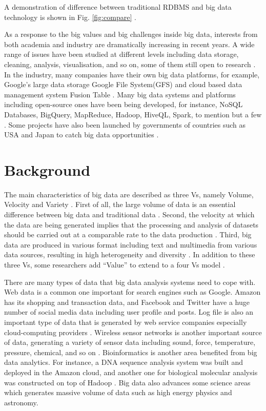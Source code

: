 \documentclass[conference]{IEEEtran}
\begin{document}
A demonstration of difference between traditional RDBMS and big data
technology is shown in Fig. \ref{fig:compare} .

As a response to the big values and big challenges inside big data,
interests from both academia and industry are dramatically increasing in
recent years. A wide range of issues have been studied at different
levels including data storage, cleaning, analysis, visualisation, and so
on, some of them still open to research \autocite{OUSSOUS2018431}. In
the industry, many companies have their own big data platforms, for
example, Google's large data storage Google File System(GFS) and cloud
based data management system Fusion Table \autocite{Hewage2018}. Many
big data systems and platforms including open-source ones have been
being developed, for instance, NoSQL Databases, BigQuery, MapReduce,
Hadoop, HiveQL, Spark, to mention but a few
\autocite{Hewage2018,SIVARAJAH2017,hu2014}. Some projects have also been
launched by governments of countries such as USA and Japan to catch big
data opportunities \autocite{OUSSOUS2018431}.

\hypertarget{background}{%
\section{Background}\label{background}}

The main characteristics of big data are described as three Vs, namely
Volume, Velocity and Variety \autocite{OUSSOUS2018431,hu2014}. First of
all, the large volume of data is an essential difference between big
data and traditional data \autocite{hu2014}. Second, the velocity at
which the data are being generated implies that the processing and
analysis of datasets should be carried out at a comparable rate to the
data production \autocite{hu2014}. Third, big data are produced in
various format including text and multimedia from various data sources,
resulting in high heterogeneity and diversity
\autocite{OUSSOUS2018431,Pouyanfar2018}. In addition to these three Vs,
some researchers add ``Value'' to extend to a four Vs model
\autocite{hashem_rise_2015}.

There are many types of data that big data analysis systems need to cope
with. Web data is a common one important for search engines such as
Google. Amazon has its shopping and transaction data, and Facebook and
Twitter have a huge number of social media data including user profile
and posts. Log file is also an important type of data that is generated
by web service companies especially cloud-computing providers
\autocite{hu2014}. Wireless sensor networks is another important source
of data, generating a variety of sensor data including sound, force,
temperature, pressure, chemical, and so on \autocite{hu2014}.
Bioinformatics is another area benefited from big data analytics. For
instance, a DNA sequence analysis system was built and deployed in the
Amazon cloud, and another one for biological molecular analysis was
constructed on top of Hadoop \autocite{hashem_rise_2015}. Big data also
advances some science areas which generates massive volume of data such
as high energy physics and astronomy.
\end{document}
